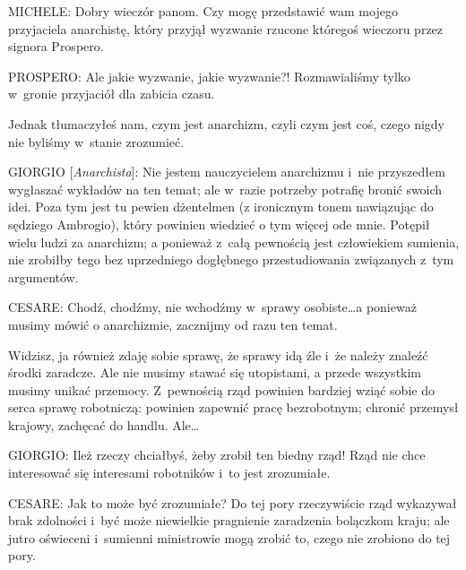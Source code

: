 \documentclass[oneside,polish,11pt,sfheadings]{mwbk}
\begin{document}
 
\noindent MICHELE: Dobry wieczór panom. Czy mogę przedstawić wam mojego przyjaciela anarchistę, który przyjął wyzwanie rzucone
któregoś wieczoru przez signora Prospero. 




 
\noindent PROSPERO: Ale jakie wyzwanie, jakie wyzwanie?! Rozmawialiśmy tylko w~gronie przyjaciół dla zabicia czasu. 

 
Jednak tłumaczyłeś nam, czym jest anarchizm, czyli czym jest coś, czego nigdy nie byliśmy w~stanie zrozumieć. 




 
\noindent GIORGIO [\textit{Anarchista}]: Nie jestem nauczycielem anarchizmu i~nie przyszedłem wygłaszać wykładów na ten
temat; ale w~razie potrzeby potrafię bronić swoich idei. Poza tym jest tu pewien dżentelmen (z ironicznym tonem
nawiązując do sędziego Ambrogio), który powinien wiedzieć o tym więcej ode mnie. Potępił wielu ludzi za anarchizm; a
ponieważ z~całą pewnością jest człowiekiem sumienia, nie zrobiłby tego bez uprzedniego dogłębnego przestudiowania
związanych z~tym argumentów. 




 
\noindent CESARE: Chodź, chodźmy, nie wchodźmy w~sprawy osobiste\ldots a ponieważ musimy mówić o anarchizmie, zacznijmy od razu ten
temat. 

 
Widzisz, ja również zdaję sobie sprawę, że sprawy idą źle i~że należy znaleźć środki zaradcze. Ale nie musimy stawać się
utopistami, a przede wszystkim musimy unikać przemocy. Z~pewnością rząd powinien bardziej wziąć sobie do serca sprawę
robotniczą: powinien zapewnić pracę bezrobotnym; chronić przemysł krajowy, zachęcać do handlu. Ale\ldots 




 
\noindent GIORGIO: Ileż rzeczy chciałbyś, żeby zrobił ten biedny rząd! Rząd nie chce interesować się interesami robotników i~to
jest zrozumiałe. 




 
\noindent CESARE: Jak to może być zrozumiałe? Do tej pory rzeczywiście rząd wykazywał brak zdolności i~być może niewielkie
pragnienie zaradzenia bolączkom kraju; ale jutro oświeceni i~sumienni ministrowie mogą zrobić to, czego nie zrobiono do
tej pory. 
\end{document}
